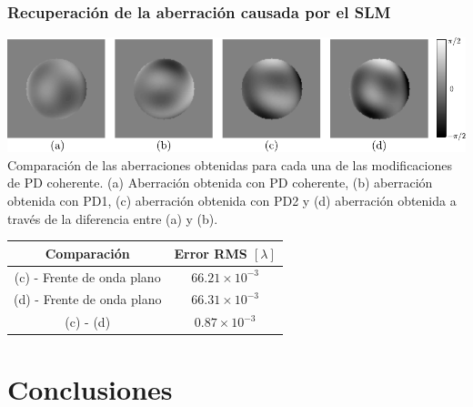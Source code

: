 \documentclass[serif,8pt]{beamer}
\begin{document}
		\begin{frame}
		\frametitle{Recuperación de la aberración causada por el SLM}
			\includegraphics[scale=0.75]{img/fases.pdf}\\
			Comparación de las aberraciones obtenidas para cada una de las modificaciones de PD coherente. (a) Aberración obtenida con PD coherente, (b) aberración obtenida con PD1, (c) aberración obtenida con PD2 y (d) aberración obtenida a través de la diferencia entre (a) y (b).
			\vspace{10pt}
			\begin{center}
			\begin{tabular}{|c|c|}
\hline 
Comparación & Error RMS $[\lambda]$ \\ 
\hline 
(c) - Frente de onda plano & $66.21\times 10^{-3} $ \\ 
\hline 
(d) - Frente de onda plano & $66.31\times 10^{-3}$ \\ 
\hline 
(c) - (d) & $0.87 \times 10^{-3}$ \\ 
\hline 
\end{tabular}
			\end{center}

		\end{frame}
%		
\section{Conclusiones}
	\setcounter{subsection}{1}
	
\end{document}
